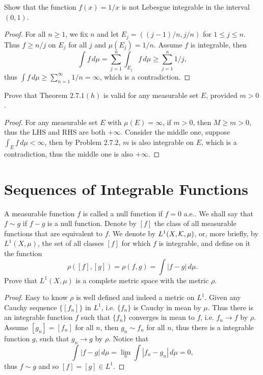 \begin{pro}%
	Show that the function $f(x)=1/x$ is not Lebesgue integrable in the interval $(0,1)$.
\end{pro}
\begin{proof}
	For all $n\geq 1$, we fix $n$ and let $E_j=((j-1)/n,j/n)$ for $1\leq j\leq n$.
	Thus $f\geq n/j$ on $E_j$ for all $j$ and $\mu(E_j)=1/n$. Assume $f$ is integrable, then 
	\[\int f\,d\mu=\sum_{j=1}^n \int_{E_j}f\,d\mu\geq \sum_{j=1}^n 1/j,\]
	thus $\int f\,d\mu\geq \sum_{n=1}^\infty 1/n=\infty$, which is a contradiction.
\end{proof}

\begin{pro}%
	Prove that Theorem $2.7.1(h)$ is valid for any measurable set $E$, provided $m>0$.
\end{pro}
\begin{proof}
	For any measurable set $E$ with $\mu(E)=\infty$, if $m>0$, then $M\geq m>0$, thus the LHS and RHS are both $+\infty$.
	Consider the middle one, suppose $\int_E f\,d\mu<\infty$, then by Problem $2.7.2$, $m$ is also integrable on $E$, which is a contradiction, thus the middle one is also $+\infty$.
\end{proof}

\section{Sequences of Integrable Functions}
\begin{pro}%
	A measurable function $f$ is called a null function if $f=0$ a.e.. We shall say that $f\sim g$ if $f-g$ is a null function. Denote by $[f]$ the class of all measurable functions that are equivalent to $f$. We denote by $L^1(X,\mathcal{K},\mu)$, or, more briefly, by $L^1(X,\mu)$, the set of all classes $[f]$ for which $f$ is integrable, and define on it the function
	\[\rho([f],[g])=\rho(f,g)=\int|f-g|\,d\mu.\]
	Prove that $L^1(X,\mu)$ is a complete metric space with the metric $\rho$.
\end{pro}
\begin{proof}
	Easy to know $\rho$ is well defined and indeed a metric on $L^1$. Given any Cauchy sequence $\{[f_n]\}$ in $L^1$, i.e. $\{f_n\}$ is Cauchy in mean by $\mu$. Thus there is an integrable function $f$ such that $\{f_n\}$ converges in mean to $f$, i.e. $f_n\to f$ by $\rho$. Assume $[g_n]=[f_n]$ for all $n$, then $g_n\sim f_n$ for all $n$, thus there is a integrable function $g$, such that $g_n\to g$ by $\rho$. Notice that 
	\[\int |f-g|\,d\mu=\lim_n \int |f_n-g_n|\,d\mu=0,\]
	thus $f\sim g$ and so $[f]=[g]\in L^1$.
\end{proof}

